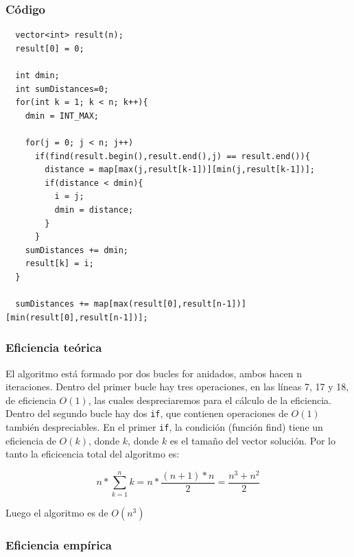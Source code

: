\documentclass[a4]{article}
\begin{document}
\subsubsection{Código}

\begin{lstlisting}
  vector<int> result(n);
  result[0] = 0;

  int dmin;
  int sumDistances=0;
  for(int k = 1; k < n; k++){
    dmin = INT_MAX;

    for(j = 0; j < n; j++)
      if(find(result.begin(),result.end(),j) == result.end()){
        distance = map[max(j,result[k-1])][min(j,result[k-1])];
        if(distance < dmin){
          i = j;
          dmin = distance;
        }
      }
    sumDistances += dmin;
    result[k] = i;
  }
  
  sumDistances += map[max(result[0],result[n-1])][min(result[0],result[n-1])];  
\end{lstlisting}

\newpage

\subsubsection{Eficiencia teórica}

El algoritmo está formado por dos bucles for anidados, ambos hacen n iteraciones. Dentro del primer bucle hay tres operaciones, en las líneas 7, 17 y 18, de eficiencia $O(1)$, las cuales despreciaremos para el cálculo de la eficiencia. Dentro del segundo bucle hay dos \verb-if-, que contienen operaciones de $O(1)$ también despreciables. En el primer \verb-if-, la condición (función find) tiene un eficiencia de $O(k)$, donde $k$, donde $k$ es el tamaño del vector solución. Por lo tanto la eficicencia total del algoritmo es:

$$n*\sum_{k=1}^{n}k = n*\frac{(n+1)*n}{2} = \frac{n^3+n^2}{2}$$

Luego el algoritmo es de $O(n^3)$

\subsubsection{Eficiencia empírica}
\end{document}
